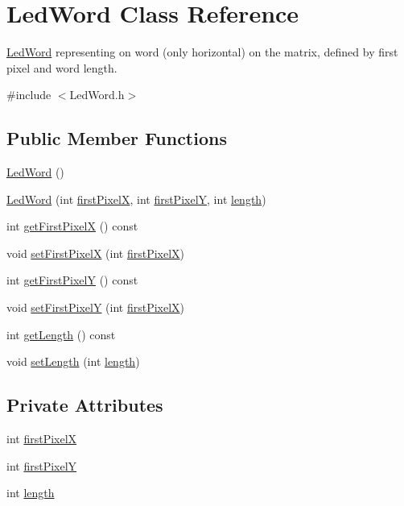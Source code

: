 \hypertarget{class_led_word}{}\section{Led\+Word Class Reference}
\label{class_led_word}


\mbox{\hyperlink{class_led_word}{Led\+Word}} representing on word (only horizontal) on the matrix, defined by first pixel and word length.  




{\ttfamily \#include $<$Led\+Word.\+h$>$}

\subsection*{Public Member Functions}
\begin{DoxyCompactItemize}
\item 
\mbox{\hyperlink{class_led_word_ac6eaebc78df7dae57ee83e21d400d9cf}{Led\+Word}} ()
\item 
\mbox{\hyperlink{class_led_word_a3be466e30df512d7d4baf1e48819df48}{Led\+Word}} (int \mbox{\hyperlink{class_led_word_aa6052f570a53041fd3c301bd32b3f52a}{first\+PixelX}}, int \mbox{\hyperlink{class_led_word_a9b5fd331725bcdfcae12fec2ca1bd61e}{first\+PixelY}}, int \mbox{\hyperlink{class_led_word_a8c96d7c16c944052c6ef13f3b30e6385}{length}})
\item 
int \mbox{\hyperlink{class_led_word_adb0caa32752f9d86c7a2b40baaf7b8b2}{get\+First\+PixelX}} () const
\item 
void \mbox{\hyperlink{class_led_word_aa90a6ff178e09029cf8ab8b206d3872c}{set\+First\+PixelX}} (int \mbox{\hyperlink{class_led_word_aa6052f570a53041fd3c301bd32b3f52a}{first\+PixelX}})
\item 
int \mbox{\hyperlink{class_led_word_ab8c7b9c8e218b3b0f9aabfd2a0134679}{get\+First\+PixelY}} () const
\item 
void \mbox{\hyperlink{class_led_word_a240f0b27e0ad573ae91bbd036213ad25}{set\+First\+PixelY}} (int \mbox{\hyperlink{class_led_word_aa6052f570a53041fd3c301bd32b3f52a}{first\+PixelX}})
\item 
int \mbox{\hyperlink{class_led_word_a5c3b00f43585783fa56a4c2d2fc1eb41}{get\+Length}} () const
\item 
void \mbox{\hyperlink{class_led_word_a5f7dbc94bd68492b0e4f2340d3d0421f}{set\+Length}} (int \mbox{\hyperlink{class_led_word_a8c96d7c16c944052c6ef13f3b30e6385}{length}})
\end{DoxyCompactItemize}
\subsection*{Private Attributes}
\begin{DoxyCompactItemize}
\item 
int \mbox{\hyperlink{class_led_word_aa6052f570a53041fd3c301bd32b3f52a}{first\+PixelX}}
\item 
int \mbox{\hyperlink{class_led_word_a9b5fd331725bcdfcae12fec2ca1bd61e}{first\+PixelY}}
\item 
int \mbox{\hyperlink{class_led_word_a8c96d7c16c944052c6ef13f3b30e6385}{length}}
\end{DoxyCompactItemize}


